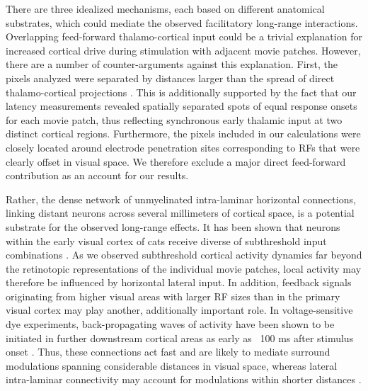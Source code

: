 There are three idealized mechanisms, each based on different anatomical
substrates, which could mediate the observed facilitatory long-range
interactions. Overlapping feed-forward thalamo-cortical input could be a
trivial explanation for increased cortical drive during stimulation with
adjacent movie patches. However, there are a number of counter-arguments
against this explanation. First, the pixels analyzed were separated by
distances larger than the spread of direct thalamo-cortical projections
\citep{humphrey1985a, bringuier1999a}. This is additionally supported by
the fact that our latency measurements revealed spatially separated spots
of equal response onsets for each movie patch, thus reflecting synchronous
early thalamic input at two distinct cortical regions. Furthermore, the
pixels included in our calculations were closely located around electrode
penetration sites corresponding to RFs that were clearly
offset in visual space. We therefore exclude a major direct feed-forward
contribution as an account for our results.

Rather, the dense network of unmyelinated intra-laminar horizontal
connections, linking distant neurons across several millimeters of cortical
space, is a potential substrate for the observed long-range effects. It has
been shown that neurons within the early visual cortex of cats receive
diverse of subthreshold input combinations \citep{monier2003a}. As we
observed subthreshold cortical activity dynamics far beyond the retinotopic
representations of the individual movie patches, local activity may
therefore be influenced by horizontal lateral input. In addition, feedback
signals originating from higher visual areas with larger RF sizes than in
the primary visual cortex may play another, additionally important role.
In voltage-sensitive dye experiments, back-propagating waves of activity
have been shown to be initiated in further downstream cortical areas as
early as ~100 ms after stimulus onset \citep{roland2006a, xu2007a}. Thus,
these connections act fast \citep{lamme2000a, hupe2001a} and are likely to
mediate surround modulations spanning considerable distances in visual
space, whereas lateral intra-laminar connectivity may account for
modulations within shorter distances \citep{angelucci2002a}.


